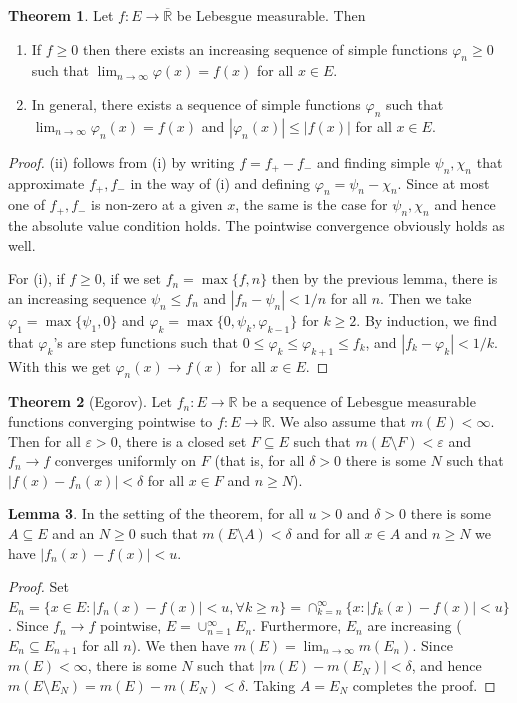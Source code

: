 \documentclass{article}
\newcommand{\R}{\mathbb{R}}
\newcommand{\cl}[1]{\overline{#1}}
\theoremstyle{definition} %
\newtheorem{thm}{Theorem}
\numberwithin{thm}{section} %
\newtheorem{lemma}[thm]{Lemma}
\theoremstyle{definition} %
\begin{document}
\begin{thm}
Let $f: E \to \cl{\R}$ be Lebesgue measurable. Then 
\begin{enumerate}[label = (\roman*)]
    \item If $f \geq 0$ then there exists an increasing sequence of simple functions $\varphi_n \geq 0$ such that $\lim_{n \to \infty} \varphi(x) = f(x)$ for all $x \in E$.
    \item In general, there exists a sequence of simple functions $\varphi_n$ such that $\lim_{n \to \infty} \varphi_n(x) = f(x)$ and $|\varphi_n(x)| \leq |f(x)|$ for all $x \in E$.
\end{enumerate}
\end{thm}
\begin{proof}
(ii) follows from (i) by writing $f = f_+ - f_-$ and finding simple $\psi_n, \chi_n$ that approximate $f_+, f_-$ in the way of (i) and defining $\varphi_n = \psi_n - \chi_n$. Since at most one of $f_+, f_-$ is non-zero at a given $x$, the same is the case for $\psi_n, \chi_n$ and hence the absolute value condition holds. The pointwise convergence obviously holds as well.

For (i), if $f \geq 0$, if we set $f_n = \max\{f, n\}$ then by the previous lemma, there is an increasing sequence $\psi_n \leq f_n$ and $|f_n - \psi_n| < 1/n$ for all $n$. Then we take $\varphi_1 = \max\{\psi_1, 0\}$ and $\varphi_k = \max\{0, \psi_k, \varphi_{k - 1}\}$ for $k \geq 2$. By induction, we find that $\varphi_k$'s are step functions such that $0 \leq \varphi_k \leq \varphi_{k + 1} \leq f_k$, and $|f_k - \varphi_k| < 1/k$. With this we get $\varphi_n(x) \to f(x)$ for all $x \in E$.
\end{proof}

\begin{thm}[Egorov]
    Let $f_n: E \to \R$ be a sequence of Lebesgue measurable functions converging pointwise to $f: E \to \R$. We also assume that $m(E) < \infty$. Then for all $\varepsilon > 0$, there is a closed set $F \subseteq E$ such that $m(E \setminus F) < \varepsilon$ and $f_n \to f$ converges uniformly on $F$ (that is, for all $\delta > 0$ there is some $N$ such that $|f(x) - f_n(x)| < \delta$ for all $x \in F$ and $n \geq N$).
\end{thm}

\begin{lemma}
    In the setting of the theorem, for all $u > 0$ and $\delta > 0$ there is some $A \subseteq E$ and an $N \geq 0$ such that $m(E \setminus A) < \delta$ and for all $x \in A$ and $n \geq N$ we have $|f_n(x) - f(x)| < u$.
\end{lemma}
\begin{proof}
Set $E_n = \{x \in E: |f_n(x) - f(x)| < u, \forall k \geq n\} = \cap_{k = n}^\infty \{x: |f_k(x) - f(x)| < u\}$. Since $f_n \to f$ pointwise, $E = \cup_{n = 1}^\infty E_n$. Furthermore, $E_n$ are increasing ($E_n \subseteq E_{n + 1}$ for all $n$). We then have $m(E) = \lim_{n \to \infty} m(E_n)$. Since $m(E) < \infty$, there is some $N$ such that $|m(E) - m(E_N)| < \delta$, and hence $m(E \setminus E_N) = m(E) - m(E_N) < \delta$. Taking $A = E_N$ completes the proof.
\end{proof}
\end{document}

